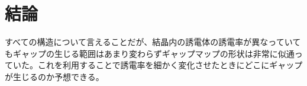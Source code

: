 \documentclass[platex,dvipdfmx]{jsreport}
\numberwithin{equation}{section}
\begin{document}
\chapter{結論}
すべての構造について言えることだが、結晶内の誘電体の誘電率が異なっていてもギャップの生じる範囲はあまり変わらずギャップマップの形状は非常に似通っていた。これを利用することで誘電率を細かく変化させたときにどこにギャップが生じるのか予想できる。
\end{document}
